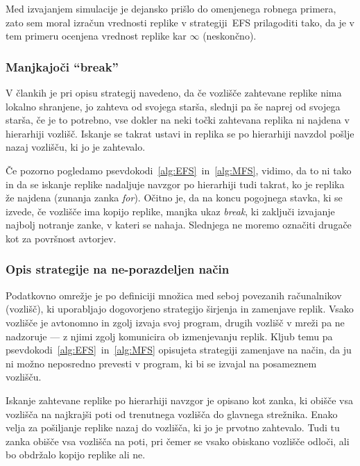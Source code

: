 \documentclass[a4paper, 12pt]{book}
\begin{document}
Med izvajanjem simulacije je dejansko prišlo do omenjenega robnega primera,
zato sem moral izračun vrednosti replike v strategiji~EFS prilagoditi tako,
da je v tem primeru ocenjena vrednost replike kar $\infty$ (neskončno).

\subsubsection{Manjkajoči ``break''}

V člankih je pri opisu strategij navedeno, da če vozlišče zahtevane replike
nima lokalno shranjene, jo zahteva od svojega starša, slednji pa še naprej
od svojega starša, če je to potrebno, vse dokler na neki točki zahtevana
replika ni najdena v hierarhiji vozlišč. Iskanje se takrat ustavi in replika
se po hierarhiji navzdol pošlje nazaj vozlišču, ki jo je zahtevalo.

Če pozorno pogledamo psevdokodi~\ref{alg:EFS}~in~\ref{alg:MFS}, vidimo, da to
ni tako in da se iskanje replike nadaljuje navzgor po hierarhiji tudi takrat,
ko je replika že najdena (zunanja zanka \textit{for}). Očitno je, da na koncu
pogojnega stavka, ki se izvede, če vozlišče ima kopijo replike, manjka ukaz
\textit{break}, ki zaključi izvajanje najbolj notranje zanke, v kateri se
nahaja. Slednjega ne moremo označiti drugače kot za površnost avtorjev.

\subsubsection{Opis strategije na ne-porazdeljen način}

Podatkovno omrežje je po definiciji množica med seboj povezanih računal\-nikov
(vozlišč), ki uporabljajo dogovorjeno strategijo širjenja in zamenjave replik.
Vsako vozlišče je avtonomno in zgolj izvaja svoj program, drugih vozlišč v
mreži pa ne nadzoruje --- z njimi zgolj komunicira ob izmenjevanju
replik. Kljub temu pa psevdokodi~\ref{alg:EFS}~in~\ref{alg:MFS}
opisujeta strategiji zamenjave na način, da ju ni možno neposredno prevesti v
program, ki bi se izvajal na posameznem vozlišču.

Iskanje zahtevane replike po hierarhiji navzgor je opisano kot zanka, ki obišče
vsa vozlišča na najkrajši poti od trenutnega vozlišča do glavnega strežnika.
Enako velja za pošiljanje replike nazaj do vozlišča, ki jo je prvotno
zahtevalo.
Tudi tu zanka obišče vsa vozlišča na poti, pri čemer se vsako obiskano vozlišče
odloči, ali bo obdržalo kopijo replike ali ne.
\end{document}
